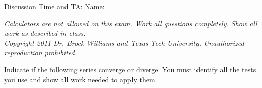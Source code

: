 \documentclass{exam}[12pt]
\begin{document}
\pagestyle{head}

{\large \hspace{1in} }
\large{\hspace{-0.5in} Discussion Time and TA: \hspace{3.5in} Name:}
\vspace{.2in}

\extraheadheight{-.2in}
\extrafootheight{-.8in} 

\small{\textit{Calculators are not allowed on this  exam. 
Work all questions completely.  Show all work as described in class. \\
Copyright 2011 Dr. Brock Williams and
Texas Tech University.  Unauthorized reproduction prohibited.}
\begin{questions}
\large{



\question Indicate if the following series converge or diverge.  You must
identify all the tests you use and show all work needed to apply them.

}
\end{questions}}
\end{document}
